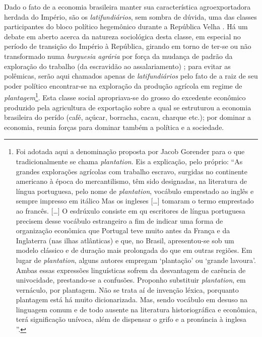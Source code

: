 Dado o fato de a economia brasileira manter sua característica agroexportadora herdada do Império, são os \textit{latifundiários}, sem sombra de dúvida, uma das classes participantes do bloco político hegemônico durante a República Velha \cite{gorender_burguesia_1990,oliveira_emopro_1977,CARONE1970inst}. Há um debate em aberto acerca da natureza sociológica desta classe, em especial no período de transição do Império à República, girando em torno de ter-se ou não transformado numa \textit{burguesia agrária} por força da mudança de padrão da exploração do trabalho (da escravidão ao assalariamento) \cite{gorender_burguesia_1990,oliveira_emopro_1977}; para evitar as polêmicas, serão aqui chamados apenas de \textit{latifundiários} pelo fato de a raiz de seu poder político encontrar-se na exploração da produção agrícola em regime de \textit{plantagem}\footnote{Foi adotada aqui a denominação proposta por Jacob Gorender para o que tradicionalmente se chama \textit{plantation}. Eis a explicação, pelo próprio: ``As grandes explorações agrícolas com trabalho escravo, surgidas no continente americano à época do mercantilismo, têm sido designadas, na literatura de língua portuguesa, pelo nome de \textit{plantation}, vocábulo emprestado ao inglês e sempre impresso em itálico Mas os ingleses [\dots] tomaram o termo emprestado ao francês. [\dots] O esdrúxulo consiste em qu escritores de língua portuguesa precisem desse vocábulo estrangeiro a fim de indicar uma forma de organização econômica que Portugal teve muito antes da França e da Inglaterra (nas ilhas atlânticas) e que, no Brasil, apresentou-se sob um modelo clássico e de duração mais prolongada do que em outras regiões. Em lugar de \textit{plantation}, alguns autores empregam `plantação' ou `grande lavoura'. Ambas essas expressões linguísticas sofrem da desvantagem de carência de univocidade, prestando-se a confusões. Proponho substituir \textit{plantation}, em vernáculo, por plantagem. Não se trata aí de invenção léxica, porquanto plantagem está há muito dicionarizada. Mas, sendo vocábulo em desuso na linguagem comum e de todo ausente na literatura historiográfica e econômica, terá significação unívoca, além de dispensar o grifo e a pronúncia à inglesa \cite[pp.~119-120]{gorender_escracolo_2010}''.}. Esta classe social apropriava-se do grosso do excedente econômico produzido pela agricultura de exportação sobre a qual se estruturou a economia brasileira do perído (café, açúcar, borracha, cacau, charque etc.); por dominar a economia, reunia forças para dominar também a política e a sociedade.

